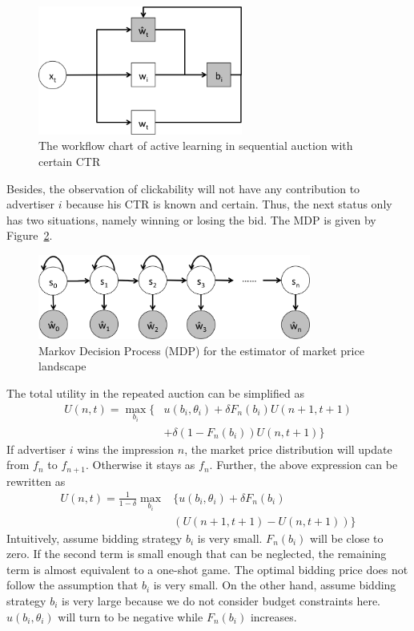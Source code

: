 \begin{figure}[htbp]
\centering
\includegraphics[width=0.6\textwidth]{active.png}
\caption{The workflow chart of active learning in sequential auction with certain CTR}
\label{fig:active}
\end{figure}
Besides, the observation of clickability will not have any contribution to advertiser $i$ because his CTR is known and certain. Thus, the next status only has two situations, namely winning or losing the bid. The MDP is given by Figure~\ref{fig:MDPs}.
\begin{figure}[htbp]
\centering
\includegraphics[width=0.8\textwidth]{MDPs.png}
\caption{Markov Decision Process (MDP) for the estimator of market price landscape}
\label{fig:MDPs}
\end{figure}

The total utility in the repeated auction can be simplified as 
\begin{equation}
\begin{split}
U(n,t)=\underset{b_{i}}{\max}\{ & u(b_i,\theta_i) + \delta F_{n}(b_i)U(n+1,t+1) \\
& + \delta (1-F_{n}(b_i))U(n,t+1) \}
\end{split}
\end{equation}
If advertiser $i$ wins the impression $n$, the market price distribution will update from $f_n$ to $f_{n+1}$. Otherwise it stays as $f_n$. Further, the above expression can be rewritten as
\begin{equation}
\label{eq:total utility}
\begin{split}
U(n,t)=\frac{1}{1-\delta}\underset{b_{i}}{\max}&\{ u(b_i,\theta_i)+\delta F_{n}(b_i) \\
& (U(n+1,t+1)-U(n,t+1)) \}
\end{split}
\end{equation}
Intuitively, assume bidding strategy $b_i$ is very small. $F_{n}(b_i)$ will be close to zero. If the second term is small enough that can be neglected, the remaining term is almost equivalent to a one-shot game. The optimal bidding price does not follow the assumption that $b_i$ is very small. On the other hand, assume bidding strategy $b_i$ is very large because we do not consider budget constraints here. $u(b_i,\theta_i)$ will turn to be negative while $F_{n}(b_i)$ increases. 

